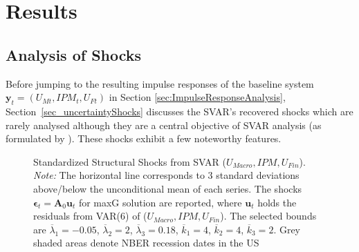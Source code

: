 \documentclass[a4paper,11pt,listof=nochaptergap,oneside,pointednumbers,bibtotoc,bigheadings,liststotoc]{scrbook}
\theoremstyle{mysatz}
\theoremstyle{mydefinition}
\theoremstyle{mytheorem}
\theoremstyle{mybemerkung}
\newcommand{\vect}[1]{\boldsymbol{\mathbf{#1}}}
\begin{document}
\chapter{Results}
\label{Results}

\section{Analysis of Shocks}
\label{sec:uncertaintyShocks}

Before jumping to the resulting impulse responses of the baseline system $\vect{y}_t = (U_{Mt}, IPM_{t}, U_{Ft})$ in Section \ref{sec:ImpulseResponseAnalysis}, Section~\ref{sec_uncertaintyShocks} discusses the SVAR's recovered shocks which are rarely analysed although they are a central objective of SVAR analysis (as formulated by \citealp{ludvigsonetal:17}). These shocks exhibit a few noteworthy features.\\


\begin{figure}[!h]
   \centering
   \setlength\fboxsep{0pt}
   \setlength\fboxrule{0pt}
      \caption[Standardized Structural Shocks from SVAR ($U_{Macro}, IPM, U_{Fin}$).]{Standardized Structural Shocks from SVAR ($U_{Macro}, IPM, U_{Fin}$).\\
      \textit{Note:}  The horizontal line corresponds to 3 standard deviations above/below the unconditional mean of each series. The shocks $\vect{\epsilon}_t = \vect{A}_0\vect{u}_t$ for maxG solution are reported, where $\vect{u}_t$ holds the residuals from VAR(6) of ($U_{Macro}, IPM, U_{Fin}$). The selected bounds are $\overline{\lambda}_1 = -0.05$, $\overline{\lambda}_2 = 2$, $\overline{\lambda}_3 = 0.18$, $\overline{k}_1 = 4$, $\overline{k}_2 = 4$, $\overline{k}_3 = 2$. Grey shaded areas denote NBER recession dates in the US}   \label{fig:ludvigsonetal_timeseries_e_shocks}
\end{figure}
\end{document}
